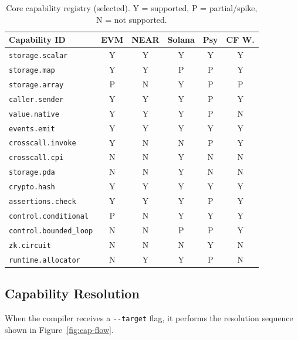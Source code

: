 \documentclass[sigconf]{acmart}
\newcommand{\ttab}{\scriptsize}
\begin{document}
\begin{table}[t]
  \caption{Core capability registry (selected). Y = supported, P = partial/spike, N = not supported.}
  \label{tab:capreg}
  \centering
  \ttab
  \begin{tabular}{l c c c c c}
    \toprule
    \bfseries Capability ID & \bfseries EVM & \bfseries NEAR & \bfseries Solana & \bfseries Psy & \bfseries CF W. \\
    \midrule
    \texttt{storage.scalar}        & Y & Y & Y & Y & Y \\
    \texttt{storage.map}           & Y & Y & P & P & Y \\
    \texttt{storage.array}        & P & N & Y & P & P \\
    \texttt{caller.sender}         & Y & Y & Y & P & Y \\
    \texttt{value.native}          & Y & Y & Y & P & N \\
    \texttt{events.emit}           & Y & Y & Y & Y & Y \\
    \texttt{crosscall.invoke}      & Y & N & N & P & Y \\
    \texttt{crosscall.cpi}         & N & N & Y & N & N \\
    \texttt{storage.pda}           & N & N & Y & N & N \\
    \texttt{crypto.hash}           & Y & Y & Y & Y & Y \\
    \texttt{assertions.check}      & Y & Y & Y & P & Y \\
    \texttt{control.conditional}  & P & N & Y & Y & Y \\
    \texttt{control.bounded\_loop} & N & N & P & P & Y \\
    \texttt{zk.circuit}            & N & N & N & Y & N \\
    \texttt{runtime.allocator}    & N & Y & Y & P & N \\
    \bottomrule
  \end{tabular}
\end{table}

\subsection{Capability Resolution}

When the compiler receives a \texttt{-{}-target} flag, it performs the resolution sequence
shown in Figure~\ref{fig:cap-flow}.
\end{document}
